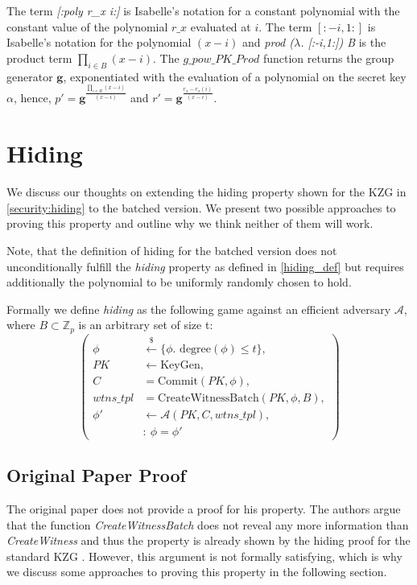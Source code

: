 The term \textit{[:poly r\_x i:]} is Isabelle's notation for a constant polynomial with the constant value of the polynomial $r\_x$ evaluated at $i$. The term $[:-i,1:]$ is Isabelle's notation for the polynomial $(x-i)$ and \textit{prod ($\lambda$. [:-i,1:]) B} is the product term $\prod_{i\in B}^{}(x-i)$. The $g\_pow\_PK\_Prod$ function returns the group generator $\mathbf{g}$, exponentiated with the evaluation of a polynomial on the secret key $\alpha$, hence, $p'=\mathbf{g}^{\frac{\prod_{i\in B}^{}(x-i)}{(x-i)}}$ and $r'=\mathbf{g}^{\frac{r_x-r_x(i)}{(x-i)}}$.

\section{Hiding}
\label{batch:security:hiding}

We discuss our thoughts on extending the hiding property shown for the KZG in \ref*{security:hiding} to the batched version. We present two possible approaches to proving this property and outline why we think neither of them will work. 

Note, that the definition of hiding for the batched version does not unconditionally fulfill the \textit{hiding} property as defined in \ref{hiding_def} but requires additionally the polynomial to be uniformly randomly chosen to hold.

Formally we define \textit{hiding} as the following game against an efficient adversary $\mathcal{A}$, where $B \subset \mathbb{Z}_p$ is an arbitrary set of size t:
\begin{equation*}
    \left(
        \begin{aligned}
            \phi & \overset{{\scriptscriptstyle\$}}{\leftarrow} \{\phi. \text{ degree}(\phi)\le t\},\\
            PK & \leftarrow \text{KeyGen}, \\
            C & = \text{Commit}(PK,\phi), \\
            wtns\_tpl &= \text{CreateWitnessBatch}(PK,\phi,B),\\
            \phi' & \leftarrow \mathcal{A}(PK,C,wtns\_tpl), \\
            & : \ \phi = \phi'
        \end{aligned}
    \right)
\end{equation*}

\subsection*{Original Paper Proof}
The original paper \parencite{KZG} does not provide a proof for his property. 
The authors argue that the function \textit{CreateWitnessBatch} does not reveal any more information than \textit{CreateWitness} and thus the property is already shown by the hiding proof for the standard KZG \parencite{KZG}. 
However, this argument is not formally satisfying, which is why we discuss some approaches to proving this property in the following section.

